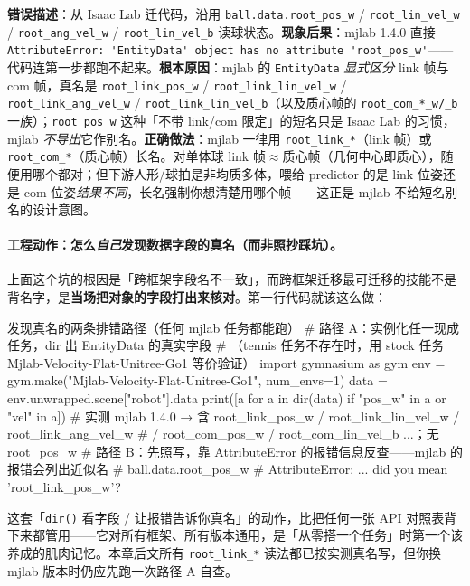 \begin{pitfall}
\textbf{错误描述}：从 Isaac Lab 迁代码，沿用 \verb|ball.data.root_pos_w| / \verb|root_lin_vel_w| / \verb|root_ang_vel_w| / \verb|root_lin_vel_b| 读球状态。\textbf{现象后果}：mjlab 1.4.0 直接 \verb|AttributeError: 'EntityData' object has no attribute 'root_pos_w'|——代码连第一步都跑不起来。\textbf{根本原因}：mjlab 的 \verb|EntityData| \emph{显式区分} link 帧与 com 帧，真名是 \verb|root_link_pos_w| / \verb|root_link_lin_vel_w| / \verb|root_link_ang_vel_w| / \verb|root_link_lin_vel_b|（以及质心帧的 \verb|root_com_*_w/_b| 一族）；\verb|root_pos_w| 这种「不带 link/com 限定」的短名只是 Isaac Lab 的习惯，mjlab \emph{不导出}它作别名。\textbf{正确做法}：mjlab 一律用 \verb|root_link_*|（link 帧）或 \verb|root_com_*|（质心帧）长名。对单体球 link 帧$\approx$质心帧（几何中心即质心），随便用哪个都对；但下游人形/球拍是非均质多体，喂给 predictor 的是 link 位姿还是 com 位姿\emph{结果不同}，长名强制你想清楚用哪个帧——这正是 mjlab 不给短名别名的设计意图。
\end{pitfall}

\paragraph{工程动作：怎么\emph{自己}发现数据字段的真名（而非照抄踩坑）。}上面这个坑的根因是「跨框架字段名不一致」，而跨框架迁移最可迁移的技能不是背名字，是\textbf{当场把对象的字段打出来核对}。第一行代码就该这么做：

\begin{codebox}[Python]{发现真名的两条排错路径（任何 mjlab 任务都能跑）}
# 路径 A：实例化任一现成任务，dir 出 EntityData 的真实字段
#   （tennis 任务不存在时，用 stock 任务 Mjlab-Velocity-Flat-Unitree-Go1 等价验证）
import gymnasium as gym
env = gym.make("Mjlab-Velocity-Flat-Unitree-Go1", num_envs=1)
data = env.unwrapped.scene["robot"].data
print([a for a in dir(data) if "pos_w" in a or "vel" in a])
#   实测 mjlab 1.4.0 → 含 root_link_pos_w / root_link_lin_vel_w / root_link_ang_vel_w
#                       / root_com_pos_w / root_com_lin_vel_b ...；无 root_pos_w
# 路径 B：先照写，靠 AttributeError 的报错信息反查——mjlab 的报错会列出近似名
#   ball.data.root_pos_w   # AttributeError: ... did you mean 'root_link_pos_w'?
\end{codebox}

这套「\verb|dir()| 看字段 / 让报错告诉你真名」的动作，比把任何一张 API 对照表背下来都管用——它对所有框架、所有版本通用，是「从零搭一个任务」时第一个该养成的肌肉记忆。本章后文所有 \verb|root_link_*| 读法都已按实测真名写，但你换 mjlab 版本时仍应先跑一次路径 A 自查。

